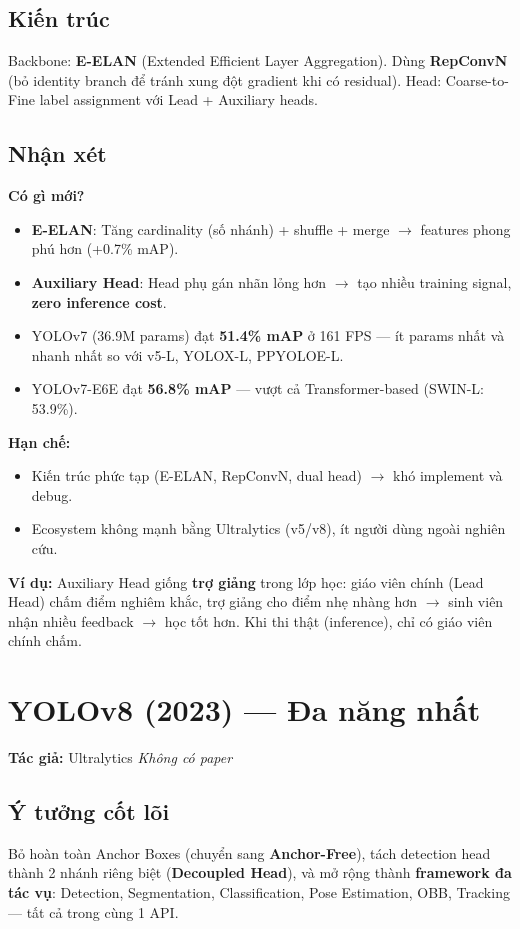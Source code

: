 \documentclass[12pt,a4paper]{report}
\begin{document}
\subsection{Kiến trúc}
Backbone: \textbf{E-ELAN} (Extended Efficient Layer Aggregation). Dùng \textbf{RepConvN} (bỏ identity branch để tránh xung đột gradient khi có residual). Head: Coarse-to-Fine label assignment với Lead + Auxiliary heads.

\subsection{Nhận xét}

\textbf{Có gì mới?}
\begin{itemize}
    \item \textbf{E-ELAN}: Tăng cardinality (số nhánh) + shuffle + merge $\rightarrow$ features phong phú hơn (+0.7\% mAP).
    \item \textbf{Auxiliary Head}: Head phụ gán nhãn lỏng hơn $\rightarrow$ tạo nhiều training signal, \textbf{zero inference cost}.
    \item YOLOv7 (36.9M params) đạt \textbf{51.4\% mAP} ở 161 FPS --- ít params nhất và nhanh nhất so với v5-L, YOLOX-L, PPYOLOE-L.
    \item YOLOv7-E6E đạt \textbf{56.8\% mAP} --- vượt cả Transformer-based (SWIN-L: 53.9\%).
\end{itemize}

\textbf{Hạn chế:}
\begin{itemize}
    \item Kiến trúc phức tạp (E-ELAN, RepConvN, dual head) $\rightarrow$ khó implement và debug.
    \item Ecosystem không mạnh bằng Ultralytics (v5/v8), ít người dùng ngoài nghiên cứu.
\end{itemize}

\textbf{Ví dụ:} Auxiliary Head giống \textbf{trợ giảng} trong lớp học: giáo viên chính (Lead Head) chấm điểm nghiêm khắc, trợ giảng cho điểm nhẹ nhàng hơn $\rightarrow$ sinh viên nhận nhiều feedback $\rightarrow$ học tốt hơn. Khi thi thật (inference), chỉ có giáo viên chính chấm.

\section{YOLOv8 (2023) --- Đa năng nhất}
\textbf{Tác giả:} Ultralytics \hfill \textit{Không có paper}

\subsection{Ý tưởng cốt lõi}
Bỏ hoàn toàn Anchor Boxes (chuyển sang \textbf{Anchor-Free}), tách detection head thành 2 nhánh riêng biệt (\textbf{Decoupled Head}), và mở rộng thành \textbf{framework đa tác vụ}: Detection, Segmentation, Classification, Pose Estimation, OBB, Tracking --- tất cả trong cùng 1 API.
\end{document}
